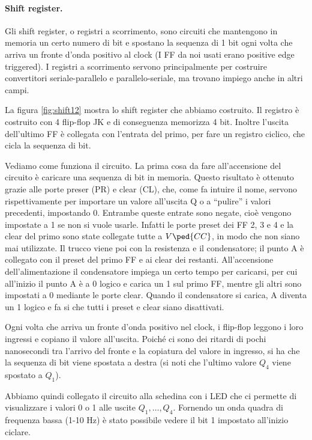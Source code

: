 \paragraph{Shift register.}

Gli shift register, o registri a scorrimento, sono circuiti che mantengono in memoria un certo numero di bit
e spostano la sequenza di 1 bit ogni volta che arriva un fronte d'onda positivo al clock
(I FF da noi usati erano positive edge triggered).
I registri a scorrimento
servono principalmente per costruire convertitori seriale-parallelo e parallelo-seriale, ma trovano
impiego anche in altri campi.


La figura \ref{fig:shift12} mostra lo shift register che abbiamo costruito. Il registro
è costruito con 4 flip-flop JK e di conseguenza memorizza 4 bit. Inoltre l'uscita dell'ultimo FF
è collegata con l'entrata del primo, per fare un registro ciclico, che cicla la sequenza di bit.

Vediamo come funziona il circuito. La prima cosa da fare all'accensione del circuito è caricare
una sequenza di bit in memoria. Questo risultato è ottenuto grazie alle porte preser (PR) e clear (CL),
che, come fa intuire il nome, servono rispettivamente per importare un valore all'uscita Q o a
``pulire'' i valori precedenti, impostando 0. Entrambe queste entrate sono negate, cioè vengono impostate
a 1 se non si vuole usarle. Infatti le porte preset dei FF 2, 3 e 4 e la clear del primo sono
state collegate tutte a $V\ped{CC}$, in modo che non siano mai utilizzate. Il trucco viene poi con
la resistenza e il condensatore; il punto A è collegato con il preset del primo FF
e ai clear dei restanti. All'accensione dell'alimentazione il condensatore impiega un certo
tempo per caricarsi, per cui all'inizio il punto A è a 0 logico e carica un 1 sul primo FF,
mentre gli altri sono impostati a 0 mediante le porte clear. Quando il condensatore si carica,
A diventa un 1 logico e fa si che tutti i preset e clear siano disattivati.

Ogni volta che arriva un fronte d'onda positivo nel clock,
i flip-flop leggono i loro ingressi e copiano il valore all'uscita. Poiché ci sono
dei ritardi di pochi nanosecondi tra l'arrivo del fronte e la copiatura del valore in ingresso,
si ha che la sequenza di bit viene spostata a destra (si noti che l'ultimo valore $Q_4$ viene spostato
a $Q_1$).

Abbiamo quindi collegato il circuito alla schedina con i LED che ci permette di visualizzare i valori
0 o 1 alle uscite $Q_1,\dots,Q_4$. Fornendo un onda quadra di frequenza bassa (1-10 Hz) è stato possibile
vedere il bit 1 impostato all'inizio ciclare.

